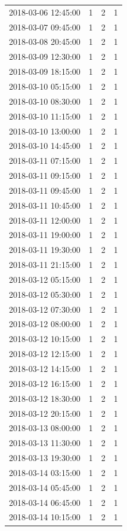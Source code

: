 \begin{tabular}{lrrr}
2018-03-06 12:45:00 & 1 & 2 & 1 \\
2018-03-07 09:45:00 & 1 & 2 & 1 \\
2018-03-08 20:45:00 & 1 & 2 & 1 \\
2018-03-09 12:30:00 & 1 & 2 & 1 \\
2018-03-09 18:15:00 & 1 & 2 & 1 \\
2018-03-10 05:15:00 & 1 & 2 & 1 \\
2018-03-10 08:30:00 & 1 & 2 & 1 \\
2018-03-10 11:15:00 & 1 & 2 & 1 \\
2018-03-10 13:00:00 & 1 & 2 & 1 \\
2018-03-10 14:45:00 & 1 & 2 & 1 \\
2018-03-11 07:15:00 & 1 & 2 & 1 \\
2018-03-11 09:15:00 & 1 & 2 & 1 \\
2018-03-11 09:45:00 & 1 & 2 & 1 \\
2018-03-11 10:45:00 & 1 & 2 & 1 \\
2018-03-11 12:00:00 & 1 & 2 & 1 \\
2018-03-11 19:00:00 & 1 & 2 & 1 \\
2018-03-11 19:30:00 & 1 & 2 & 1 \\
2018-03-11 21:15:00 & 1 & 2 & 1 \\
2018-03-12 05:15:00 & 1 & 2 & 1 \\
2018-03-12 05:30:00 & 1 & 2 & 1 \\
2018-03-12 07:30:00 & 1 & 2 & 1 \\
2018-03-12 08:00:00 & 1 & 2 & 1 \\
2018-03-12 10:15:00 & 1 & 2 & 1 \\
2018-03-12 12:15:00 & 1 & 2 & 1 \\
2018-03-12 14:15:00 & 1 & 2 & 1 \\
2018-03-12 16:15:00 & 1 & 2 & 1 \\
2018-03-12 18:30:00 & 1 & 2 & 1 \\
2018-03-12 20:15:00 & 1 & 2 & 1 \\
2018-03-13 08:00:00 & 1 & 2 & 1 \\
2018-03-13 11:30:00 & 1 & 2 & 1 \\
2018-03-13 19:30:00 & 1 & 2 & 1 \\
2018-03-14 03:15:00 & 1 & 2 & 1 \\
2018-03-14 05:45:00 & 1 & 2 & 1 \\
2018-03-14 06:45:00 & 1 & 2 & 1 \\
2018-03-14 10:15:00 & 1 & 2 & 1 \\

\end{tabular}
